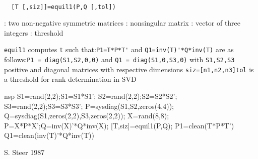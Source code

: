 \begin{mandesc}
   \\ %
\end{mandesc}
\begin{calling_sequence}
\begin{verbatim}
  [T [,siz]]=equil1(P,Q [,tol])  
\end{verbatim}
\end{calling_sequence}
\begin{parameters}
  \begin{varlist}
    : two non-negative symmetric matrices
    : nonsingular matrix
    : vector of three integers
    : threshold
  \end{varlist}
\end{parameters}
\begin{mandescription}
  \verb!equil1! computes \verb!t! such that:\verb!P1=T*P*T'!  and
  \verb!Q1=inv(T)'*Q*inv(T)! are as follows:\verb!P1 = diag(S1,S2,0,0)!  and
  \verb!Q1 = diag(S1,0,S3,0)! with \verb!S1,S2,S3! positive and diagonal
  matrices with respective dimensions \verb!siz=[n1,n2,n3]!\verb!tol! is a
  threshold for rank determination in SVD
\end{mandescription}
\begin{examples}
  \begin{mintednsp}{nsp}
    S1=rand(2,2);S1=S1*S1';
    S2=rand(2,2);S2=S2*S2';
    S3=rand(2,2);S3=S3*S3';
    P=sysdiag(S1,S2,zeros(4,4));
    Q=sysdiag(S1,zeros(2,2),S3,zeros(2,2));
    X=rand(8,8);
    P=X*P*X';Q=inv(X)'*Q*inv(X);
    [T,siz]=equil1(P,Q);
    P1=clean(T*P*T')
    Q1=clean(inv(T)'*Q*inv(T))
  \end{mintednsp}
\end{examples}
\begin{manseealso}
       
\end{manseealso}
\begin{authors}
  S. Steer 1987
\end{authors}
